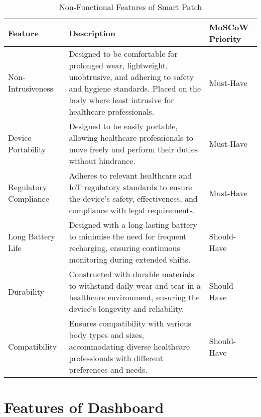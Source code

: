 \begin{table}[h]
    \centering
    \begin{tabularx}{\textwidth}{|p{3cm}|X|p{2cm}|}

         \hline

         \textbf{Feature}
         & \textbf{Description}
         & \textbf{MoSCoW Priority} \\ \hline

        Non-Intrusiveness
        & Designed to be comfortable for prolonged wear, lightweight, unobtrusive, and adhering to safety and hygiene standards. Placed on the body where least intrusive for healthcare professionals.
        & Must-Have \\ \hline

        Device Portability
        & Designed to be easily portable, allowing healthcare professionals to move freely and perform their duties without hindrance.
        & Must-Have \\ \hline

        Regulatory Compliance
        & Adheres to relevant healthcare and IoT regulatory standards to ensure the device's safety, effectiveness, and compliance with legal requirements.
        & Must-Have \\ \hline

        Long Battery Life
        & Designed with a long-lasting battery to minimise the need for frequent recharging, ensuring continuous monitoring during extended shifts.
        & Should-Have \\ \hline

        Durability
        & Constructed with durable materials to withstand daily wear and tear in a healthcare environment, ensuring the device's longevity and reliability.
        & Should-Have \\ \hline

        Compatibility
        & Ensures compatibility with various body types and sizes, accommodating diverse healthcare professionals with different preferences and needs.
        & Should-Have \\ \hline
 
    \end{tabularx}
    \caption{Non-Functional Features of Smart Patch}
    \label{tab:non-functional-sp}
\end{table}






\newpage
\section{Features of Dashboard}

